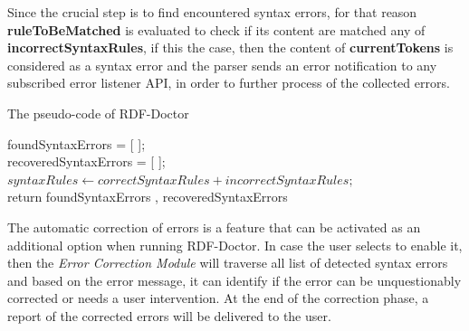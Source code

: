 Since the crucial step is to find encountered syntax errors, for that reason \textbf{ruleToBeMatched} is evaluated to check if its content are matched any of \textbf{incorrectSyntaxRules}, if this the case, then the content of \textbf{currentTokens} is considered as a syntax error and the parser sends an error notification to any subscribed error listener API, in order to further process of the collected errors. 

\begin{algorithm}[] 
 \caption{The pseudo-code of RDF-Doctor}
 \label{alg:algorithm-main}
foundSyntaxErrors = [ ];\\
recoveredSyntaxErrors = [ ];\\
$syntaxRules \leftarrow correctSyntaxRules + incorrectSyntaxRules;$\\
return foundSyntaxErrors , recoveredSyntaxErrors
\end{algorithm}

The automatic correction of errors is a feature that can be activated as an additional option when running RDF-Doctor. 
In case the user selects to enable it, then the \emph{Error Correction Module} will traverse all list of detected syntax errors and based on the error message, it can identify if the error can be unquestionably corrected or needs a user intervention. 
At the end of the correction phase, a report of the corrected errors will be delivered to the user. 

